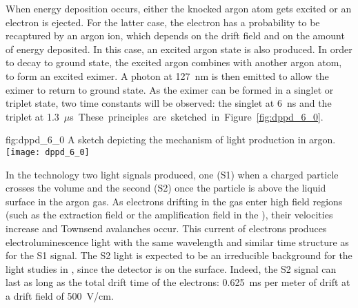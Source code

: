 When energy deposition occurs, either the knocked argon atom gets excited or an electron is ejected. For the latter case, the electron has a probability to be recaptured by an argon ion, which depends on the drift field and on the amount of energy deposited. In this case, an excited argon state is also produced. In order to decay to ground state, the excited argon combines with another argon atom, to form an excited eximer. A photon at \SI{127}{nm} is then emitted to allow the eximer to return to ground state. As the eximer can be formed in a singlet or triplet state, two time constants will be observed: the singlet at \SI{6}{ns}
and the triplet at \SI{1.3}{$\mu$s}. These principles are sketched in Figure~\ref{fig:dppd_6_0}.

\begin{dunefigure}{fig:dppd_6_0}
{A sketch depicting the mechanism of light production in argon.}
\texttt{[image: dppd\_6\_0]}
\end{dunefigure}

In the \dual technology two light signals produced, one (S1) when a charged particle crosses the \lar volume and the second (S2) once the particle is above the liquid surface in the argon gas. 
As electrons drifting in the gas enter high field regions (such as the extraction field or the amplification field in the ), their velocities increase and Townsend avalanches occur. This current of electrons produces electroluminescence light with the same wavelength and similar time structure as for the S1 signal. 
The S2 light is expected to be an irreducible background for the light studies in , since the detector is on the surface. Indeed, the S2 signal can last as long as the total drift time of the electrons: \SI{0.625}{ms} per meter of drift at a drift field of \SI{500}{V/cm}.

